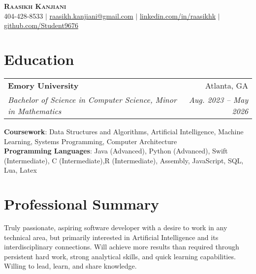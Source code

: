 \documentclass[letterpaper,11pt]{article}
\makeatletter
\newcommand{\resumeSubheading}[4]{
  \vspace{-2pt}\item
    \begin{tabular*}{0.97\textwidth}[t]{l@{\extracolsep{\fill}}r}
      \textbf{#1} & #2 \\
      \textit{\small#3} & \textit{\small #4} \\
    \end{tabular*}\vspace{-7pt}
}
\newcommand{\resumeSubHeadingListStart}{\begin{itemize}[leftmargin=0.15in, label={}]}
\newcommand{\resumeSubHeadingListEnd}{\end{itemize}}
\makeatother
\begin{document}

\begin{center}
    \textbf{\Huge \scshape Raasikh Kanjiani} \\ \vspace{1pt}
    \small 404-428-8533 $|$ \href{mailto:raasikh.kanjiani@gmail.com}{raasikh.kanjiani@gmail.com} $|$ 
    \href{https://linkedin.com/in/raasikhk}{linkedin.com/in/raasikhk} $|$
    \href{https://github.com/Student9676}{github.com/Student9676}
\end{center}


\section{Education}
  \resumeSubHeadingListStart
    \resumeSubheading
      {Emory University}{Atlanta, GA}
      {Bachelor of Science in Computer Science, Minor in Mathematics}{Aug. 2023 -- May 2026}
        \vspace{0pt}
    \small{\item{
     \textbf{Coursework}{: Data Structures and Algorithms, Artificial Intelligence, Machine Learning, Systems Programming, Computer Architecture} \\ 
     \vspace{2pt}
     \textbf{Programming Languages}{: Java (Advanced), Python (Advanced), Swift (Intermediate), C (Intermediate),\newline R (Intermediate), Assembly, JavaScript, SQL, Lua, Latex}
    }}
    
  \resumeSubHeadingListEnd

  \section{Professional Summary}
  \resumeSubHeadingListStart
  \small{\item{
   \textbf{}{Truly passionate, aspiring software developer with a desire to work in any technical area, but primarily interested in Artificial Intelligence and its interdisciplinary connections. Will achieve more results than required through persistent hard work, strong analytical skills, and quick learning capabilities. Willing to lead, learn, and share knowledge.}
  }}
  \resumeSubHeadingListEnd
\end{document}
